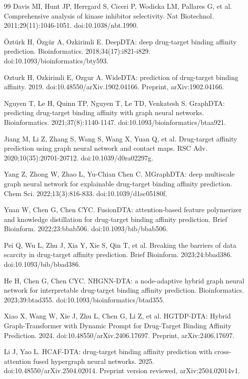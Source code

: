 \documentclass[12pt,a4paper]{article}
\begin{document}
\begin{thebibliography}{99}
 Davis MI, Hunt JP, Herrgard S, Ciceri P, Wodicka LM, Pallares G, et al. Comprehensive analysis of kinase inhibitor selectivity. Nat Biotechnol. 2011;29(11):1046-1051. doi:10.1038/nbt.1990.

 Öztürk H, Özgür A, Ozkirimli E. DeepDTA: deep drug-target binding affinity prediction. Bioinformatics. 2018;34(17):i821-i829. doi:10.1093/bioinformatics/bty593.

 Ozturk H, Ozkirimli E, Ozgur A. WideDTA: prediction of drug-target binding affinity. 2019. doi:10.48550/arXiv.1902.04166. Preprint, arXiv:1902.04166.

 Nguyen T, Le H, Quinn TP, Nguyen T, Le TD, Venkatesh S. GraphDTA: predicting drug-target binding affinity with graph neural networks. Bioinformatics. 2021;37(8):1140-1147. doi:10.1093/bioinformatics/btaa921.

 Jiang M, Li Z, Zhang S, Wang S, Wang X, Yuan Q, et al. Drug-target affinity prediction using graph neural network and contact maps. RSC Adv. 2020;10(35):20701-20712. doi:10.1039/d0ra02297g.

 Yang Z, Zhong W, Zhao L, Yu-Chian Chen C. MGraphDTA: deep multiscale graph neural network for explainable drug-target binding affinity prediction. Chem Sci. 2022;13(3):816-833. doi:10.1039/d1sc05180f.

 Yuan W, Chen G, Chen CYC. FusionDTA: attention-based feature polymerizer and knowledge distillation for drug-target binding affinity prediction. Brief Bioinform. 2022;23:bbab506. doi:10.1093/bib/bbab506.

 Pei Q, Wu L, Zhu J, Xia Y, Xie S, Qin T, et al. Breaking the barriers of data scarcity in drug-target affinity prediction. Brief Bioinform. 2023;24:bbad386. doi:10.1093/bib/bbad386.

 He H, Chen G, Chen CYC. NHGNN-DTA: a node-adaptive hybrid graph neural network for interpretable drug-target binding affinity prediction. Bioinformatics. 2023;39:btad355. doi:10.1093/bioinformatics/btad355.

 Xiao X, Wang W, Xie J, Zhu L, Chen G, Li Z, et al. HGTDP-DTA: Hybrid Graph-Transformer with Dynamic Prompt for Drug-Target Binding Affinity Prediction. 2024. doi:10.48550/arXiv.2406.17697. Preprint, arXiv:2406.17697.

 Li J, Yao L. HCAF-DTA: drug-target binding affinity prediction with cross-attention fused hypergraph neural networks. 2025. doi:10.48550/arXiv.2504.02014. Preprint version reviewed, arXiv:2504.02014v1.


\end{thebibliography}
\end{document}
